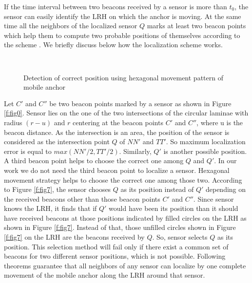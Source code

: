 \documentclass[preprint,11pt]{elsarticle}
\begin{document}
If the time interval between two beacons received by a sensor is more than $t_0$, the sensor can easily identify the LRH on which the anchor is moving. At the same time all the neighbors of the localized sensor $Q$ marks at least two beacon points which help them to
compute two probable positions of themselves according to the scheme \cite{Lee2009}. We briefly discuss below how the localization scheme \cite{Lee2009} works.
\begin{figure}[h]
    \centering
    ~~~~~~~
\caption{Detection of correct position using hexagonal movement pattern of mobile anchor}
\end{figure}


Let $C'$ and $C''$ be two beacon points marked by a sensor as shown in  Figure \ref{f:fig0}.
Sensor lies on the one of the two intersections of the circular laminae with radius
$(r-u)$ and $r$ centering at the beacon points $C'$ and $C''$,  where u is the beacon distance.
As the intersection is an area, the position of the sensor is considered as the intersection point $Q$ of $NN'$ and $TT'$.
So maximum localization error is equal to $max(NN'/2, TT'/2)$.
Similarly, $Q'$ is another possible position. A third beacon point helps to choose the correct one among $Q$ and $Q'$.
In our work we do not need the third beacon point to localize a sensor. Hexagonal movement strategy helps to
choose the correct one among those two. According to  Figure \ref{f:fig7}, the sensor chooses $Q$ as its
position instead of $Q'$ depending on the received beacons other than those beacon points $C'$ and $C''$. Since sensor
knows the LRH, it finds that if $Q'$ would have been its position than it should have received
beacons at those positions indicated by filled circles on the LRH as shown in  Figure \ref{f:fig7}.
Instead of that, those unfilled circles shown in  Figure \ref{f:fig7} on the LRH are the beacons received by $Q$.
So, sensor selects $Q$ as its position. This selection method will fail only if there exist a common set of beacons
for two different sensor positions, which is not possible.
Following theorems guarantee that all neighbors of any sensor can localize by one complete movement of the
mobile anchor along the LRH around that sensor.
\end{document}
